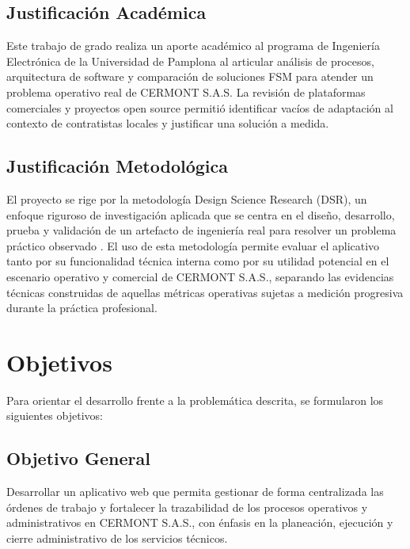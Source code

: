 \subsection{Justificación Académica}
Este trabajo de grado realiza un aporte académico al programa de Ingeniería Electrónica de la Universidad de Pamplona al articular análisis de procesos, arquitectura de software y comparación de soluciones FSM para atender un problema operativo real de CERMONT S.A.S. La revisión de plataformas comerciales y proyectos open source permitió identificar vacíos de adaptación al contexto de contratistas locales y justificar una solución a medida.

\subsection{Justificación Metodológica}
El proyecto se rige por la metodología Design Science Research (DSR), un enfoque riguroso de investigación aplicada que se centra en el diseño, desarrollo, prueba y validación de un artefacto de ingeniería real para resolver un problema práctico observado \cite{hevner2004}. El uso de esta metodología permite evaluar el aplicativo tanto por su funcionalidad técnica interna como por su utilidad potencial en el escenario operativo y comercial de CERMONT S.A.S., separando las evidencias técnicas construidas de aquellas métricas operativas sujetas a medición progresiva durante la práctica profesional.

\section{Objetivos}
\label{sec:objetivos}

Para orientar el desarrollo frente a la problemática descrita, se formularon los siguientes objetivos:

\subsection{Objetivo General}
Desarrollar un aplicativo web que permita gestionar de forma centralizada las órdenes de trabajo y fortalecer la trazabilidad de los procesos operativos y administrativos en CERMONT S.A.S., con énfasis en la planeación, ejecución y cierre administrativo de los servicios técnicos.

